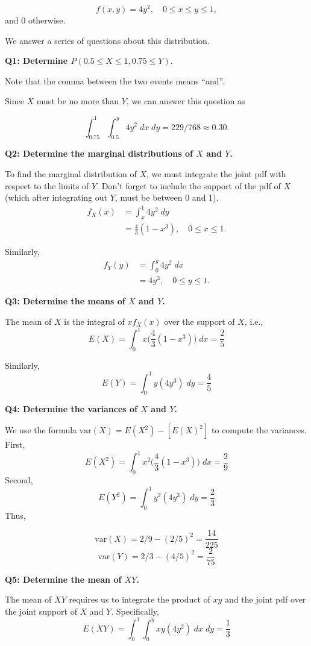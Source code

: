 \documentclass[
]{book}
\theoremstyle{definition}
\theoremstyle{definition}
\theoremstyle{definition}
\theoremstyle{definition}
\theoremstyle{remark}
\begin{document}
\[
f(x,y)=4y^2,\quad 0 \leq x\leq y\leq 1,
\]
and 0 otherwise.

We answer a series of questions about this distribution.

\textbf{Q1: Determine \(P(0.5\leq X\leq 1, 0.75\leq Y)\)}.

Note that the comma between the two events means ``and''.

Since \(X\) must be no more than \(Y\), we can answer this question as

\[
\int_{0.75}^{1} \int_{0.5}^{y} 4y^2\;dx\;dy=229/768\approx 0.30.
\]

\textbf{Q2: Determine the marginal distributions of \(X\) and \(Y\).}

To find the marginal distribution of \(X\), we must integrate the joint pdf with respect to the limits of \(Y\). Don't forget to include the support of the pdf of \(X\) (which after integrating out \(Y\), must be between 0 and 1).
\[
\begin{aligned}
f_X(x) &=\int_{x}^1 4y^2\;dy \\
&=\frac{4}{3}(1-x^3),\quad 0\leq x \leq 1.
\end{aligned}
\]

Similarly,
\[
\begin{aligned}
f_Y(y) &=\int_{0}^y 4y^2\;dx \\
&=4y^3,\quad 0\leq y \leq 1.
\end{aligned}
\]

\textbf{Q3: Determine the means of \(X\) and \(Y\).}

The mean of \(X\) is the integral of \(x f_X(x)\) over the support of \(X\), i.e.,
\[
E(X) =\int_{0}^1 x\biggl(\frac{4}{3}(1-x^3)\biggr)\;dx = \frac{2}{5}
\]

Similarly,
\[
E(Y) =\int_{0}^1 y(4y^3)\;dy = \frac{4}{5}
\]

\textbf{Q4: Determine the variances of \(X\) and \(Y\).}

We use the formula \(\mathrm{var}(X)=E(X^2)-[E(X)^2]\) to compute the variances. First,
\[
E(X^2) =\int_{0}^1 x^2\biggl(\frac{4}{3}(1-x^3)\biggr)\;dx = \frac{2}{9}
\]
Second,
\[
E(Y^2) =\int_{0}^1 y^2(4y^3)\;dy = \frac{2}{3}
\]
Thus,

\[\mathrm{var}(X)=2/9-(2/5)^2=\frac{14}{225}\]
\[\mathrm{var}(Y)=2/3-(4/5)^2=\frac{2}{75}\]

\textbf{Q5: Determine the mean of \(XY\).}

The mean of \(XY\) requires us to integrate the product of \(xy\) and the joint pdf over the joint support of \(X\) and \(Y\). Specifically,
\[
E(XY)=\int_{0}^{1}\int_{0}^{y} xy(4y^2)\;dx\;dy= \frac{1}{3}
\]
\end{document}
